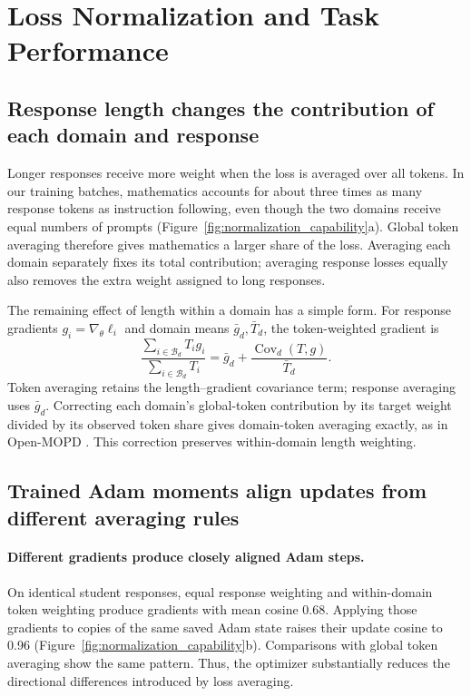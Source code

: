 \section{Loss Normalization and Task Performance}
\label{sec:normalization}

\subsection{Response length changes the contribution of each domain and response}

Longer responses receive more weight when the loss is averaged over all tokens. In our training batches, mathematics accounts for about three times as many response tokens as instruction following, even though the two domains receive equal numbers of prompts (Figure~\ref{fig:normalization_capability}a). Global token averaging therefore gives mathematics a larger share of the loss. Averaging each domain separately fixes its total contribution; averaging response losses equally also removes the extra weight assigned to long responses.

The remaining effect of length within a domain has a simple form. For response gradients $g_i=\nabla_\theta\ell_i$ and domain means $\bar g_d,\bar T_d$, the token-weighted gradient is
\begin{equation}
\frac{\sum_{i\in\mathcal B_d}T_i g_i}{\sum_{i\in\mathcal B_d}T_i}
=\bar g_d+\frac{\operatorname{Cov}_d(T,g)}{\bar T_d}.
\label{eq:weighting}
\end{equation}
Token averaging retains the length--gradient covariance term; response averaging uses $\bar g_d$. Correcting each domain's global-token contribution by its target weight divided by its observed token share gives domain-token averaging exactly, as in Open-MOPD \citep{gao2026openmopddiagnosingfixingcapability}. This correction preserves within-domain length weighting.

\subsection{Trained Adam moments align updates from different averaging rules}

\paragraph{Different gradients produce closely aligned Adam steps.}
On identical student responses, equal response weighting and within-domain token weighting produce gradients with mean cosine 0.68. Applying those gradients to copies of the same saved Adam state raises their update cosine to 0.96 (Figure~\ref{fig:normalization_capability}b). Comparisons with global token averaging show the same pattern. Thus, the optimizer substantially reduces the directional differences introduced by loss averaging.

